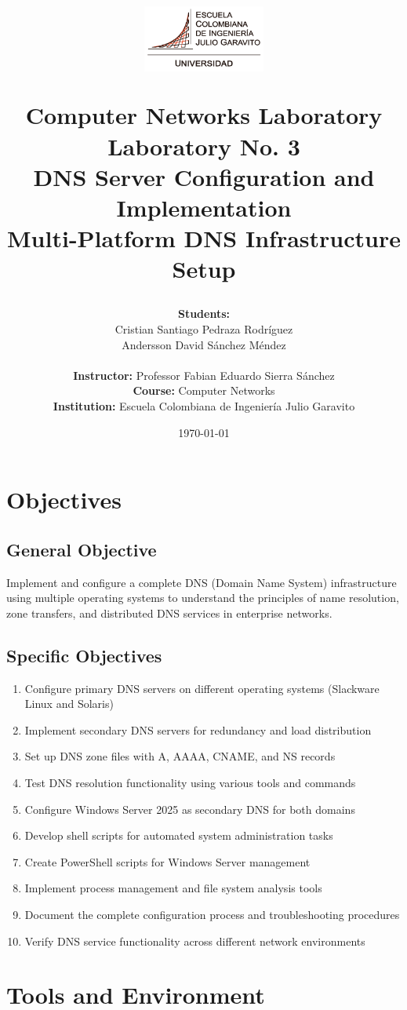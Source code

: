 \documentclass[12pt,a4paper]{article}
\title{\vspace{-2cm}
    \begin{center}
        \includegraphics[width=0.3\textwidth]{media/university_logo.png} %
    \end{center}
    \vspace{1cm}
    \textbf{\Large Computer Networks Laboratory}\\
    \vspace{0.5cm}
    \textbf{\huge Laboratory No. 3}\\
    \textbf{\huge DNS Server Configuration and Implementation}\\
    \vspace{1cm}
    \large Multi-Platform DNS Infrastructure Setup
}
\author{
    \textbf{Students:} \\
    Cristian Santiago Pedraza Rodríguez \\
    Andersson David Sánchez Méndez \\
    \vspace{0.5cm} \\
    \textbf{Instructor:} Professor Fabian Eduardo Sierra Sánchez \\
    \textbf{Course:} Computer Networks \\
    \textbf{Institution:} Escuela Colombiana de Ingeniería Julio Garavito \\
}
\date{\today}
\begin{document}
\maketitle
\thispagestyle{empty}
\newpage

\tableofcontents
\newpage

\section{Objectives}\label{sec:objectives}

\subsection{General Objective}
Implement and configure a complete DNS (Domain Name System) infrastructure using multiple operating systems to understand the principles of name resolution, zone transfers, and distributed DNS services in enterprise networks.

\subsection{Specific Objectives}
\begin{enumerate}
    \item Configure primary DNS servers on different operating systems (Slackware Linux and Solaris)
    \item Implement secondary DNS servers for redundancy and load distribution
    \item Set up DNS zone files with A, AAAA, CNAME, and NS records
    \item Test DNS resolution functionality using various tools and commands
    \item Configure Windows Server 2025 as secondary DNS for both domains
    \item Develop shell scripts for automated system administration tasks
    \item Create PowerShell scripts for Windows Server management
    \item Implement process management and file system analysis tools
    \item Document the complete configuration process and troubleshooting procedures
    \item Verify DNS service functionality across different network environments
\end{enumerate}

\section{Tools and Environment}\label{sec:tools}
\end{document}

